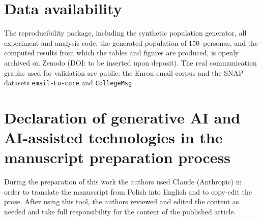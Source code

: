 \documentclass[a4paper,fleqn]{cas-sc}
\begin{document}
\section*{Data availability}
The reproducibility package, including the synthetic population generator, all experiment and analysis code, the generated population of $150$~personas, and the computed results from which the tables and figures are produced, is openly archived on Zenodo (DOI: to be inserted upon deposit). The real
communication graphs used for validation are public: the Enron email corpus \citep{klimt2004enron}
and the SNAP datasets \texttt{email-Eu-core} and \texttt{CollegeMsg} \citep{leskovec2014snap}.

\section*{Declaration of generative AI and AI-assisted technologies in the manuscript preparation process}
During the preparation of this work the authors used Claude (Anthropic) in order to translate the
manuscript from Polish into English and to copy-edit the prose. After using this tool, the authors
reviewed and edited the content as needed and take full responsibility for the content of the
published article.

\clearpage


\end{document}
